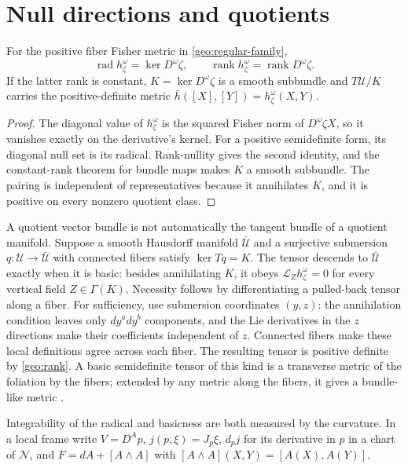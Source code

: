 \section{Null directions and quotients}

For the positive fiber Fisher metric in \cref{geo:regular-family},
\begin{equation}
\operatorname{rad}h^\omega_\zeta=\ker D^\omega\zeta,
\qquad
\operatorname{rank}h^\omega_\zeta=\operatorname{rank}D^\omega\zeta.
\label{geo:rank}
\end{equation}
If the latter rank is constant, $K=\ker D^\omega\zeta$ is a smooth subbundle and
$T\mathcal U/K$ carries the positive-definite metric
$\bar h([X],[Y])=h^\omega_\zeta(X,Y)$.
\begin{proof}
The diagonal value of $h^\omega_\zeta$ is the squared Fisher norm of $D^\omega\zeta X$, so it vanishes exactly on the derivative's kernel. For a positive semidefinite form, its diagonal null set is its radical. Rank-nullity gives the second identity, and the constant-rank theorem for bundle maps makes $K$ a smooth subbundle. The pairing is independent of representatives because it annihilates $K$, and it is positive on every nonzero quotient class.
\end{proof}

A quotient vector bundle is not automatically the tangent bundle of a quotient manifold. Suppose a smooth Hausdorff manifold $\bar{\mathcal U}$ and a surjective submersion $q:\mathcal U\to\bar{\mathcal U}$ with connected fibers satisfy $\ker Tq=K$. The tensor descends to $\bar{\mathcal U}$ exactly when it is basic: besides annihilating $K$, it obeys $\mathcal L_Zh^\omega_\zeta=0$ for every vertical field $Z\in\Gamma(K)$. Necessity follows by differentiating a pulled-back tensor along a fiber. For sufficiency, use submersion coordinates $(y,z)$: the annihilation condition leaves only $dy^a dy^b$ components, and the Lie derivatives in the $z$ directions make their coefficients independent of $z$. Connected fibers make these local definitions agree across each fiber. The resulting tensor is positive definite by \cref{geo:rank}. A basic semidefinite tensor of this kind is a transverse metric of the foliation by the fibers; extended by any metric along the fibers, it gives a bundle-like metric \citep{Reinhart1959,Molino1988}.

Integrability of the radical and basicness are both measured by the curvature. In a local frame write $V=D^Ap$, $j(p,\xi)=J_p\xi$, $d_pj$ for its derivative in $p$ in a chart of $\mathcal N$, and $F=dA+[A\wedge A]$ with $[A\wedge A](X,Y)=[A(X),A(Y)]$.

